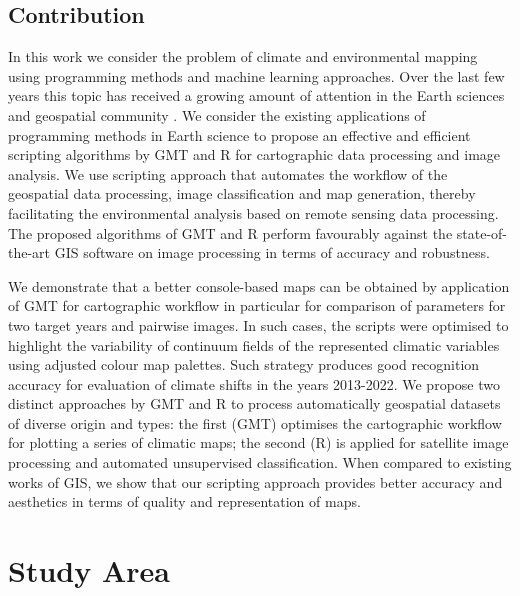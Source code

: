 \documentclass[knowledge,article,submit,pdftex,moreauthors]{Definitions/mdpi}
\begin{document}
\subsection{Contribution}

In this work we consider the problem of climate and environmental mapping using programming methods and machine learning approaches. Over the last few years this topic has received a growing amount of attention in the Earth sciences and geospatial community \cite{4779429,DIMOBE2022100768,land12010261}. We consider the existing applications of programming methods in Earth science to propose an effective and efficient scripting algorithms by GMT and R for cartographic data processing and image analysis. We use scripting approach that automates the workflow of the geospatial data processing, image classification and map generation, thereby facilitating the environmental analysis based on remote sensing data processing. The proposed algorithms of GMT and R perform favourably against the state-of-the-art GIS software on image processing in terms of accuracy and robustness. 

We demonstrate that a better console-based maps can be obtained by application of GMT for cartographic workflow in particular for comparison of parameters for two target years and pairwise images. In such cases, the scripts were optimised to highlight the variability of continuum fields of the represented climatic variables using adjusted colour map palettes. Such strategy produces good recognition accuracy for evaluation of climate shifts in the years 2013-2022. We propose two distinct approaches by GMT and R  to process automatically geospatial datasets of diverse origin and types: the first (GMT) optimises the cartographic workflow for plotting a series of climatic maps; the second (R) is applied for satellite image processing and automated unsupervised classification. When compared to existing works of GIS, we show that our scripting approach provides better accuracy and aesthetics in terms of quality and representation of maps.

\section{Study Area} 
\end{document}
